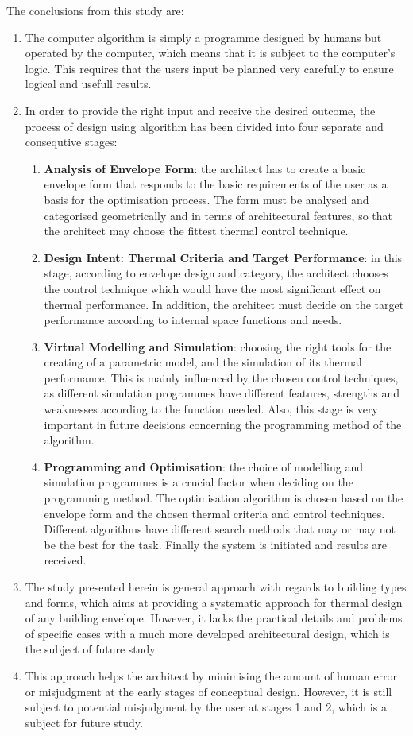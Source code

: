 The conclusions from this study are:
\begin{enumerate}
	\item The computer algorithm is simply a programme designed by humans but operated by the computer, which means that it is subject to the computer's logic. This requires that the users input be planned very carefully to ensure logical and usefull results.
	\item In order to provide the right input and receive the desired outcome, the process of design using algorithm has been divided into four separate and consequtive stages:
		\begin{enumerate}
			\item \textbf{Analysis of Envelope Form}: the architect has to create a basic envelope form that responds to the basic requirements of the user as a basis for the optimisation process. The form must be analysed and categorised geometrically and in terms of architectural features, so that the architect may choose the fittest thermal control technique.
			\item \textbf{Design Intent: Thermal Criteria and Target Performance}: in this stage, according to envelope design and category, the architect chooses the control technique which would have the most significant effect on thermal performance. In addition, the architect must decide on the target performance according to internal space functions and needs.
			\item \textbf{Virtual Modelling and Simulation}: choosing the right tools for the creating of a parametric model, and the simulation of its thermal performance. This is mainly influenced by the chosen control techniques, as different simulation programmes have different features, strengths and weaknesses according to the function needed. Also, this stage is very important in future decisions concerning the programming method of the algorithm.
			\item \textbf{Programming and Optimisation}: the choice of modelling and simulation programmes is a crucial factor when deciding on the programming method. The optimisation algorithm is chosen based on the envelope form and the chosen thermal criteria and control techniques. Different algorithms have different search methods that may or may not be the best for the task. Finally the system is initiated and results are received.
		\end{enumerate}
	\item The study presented herein is general approach with regards to building types and forms, which aims at providing a systematic approach for thermal design of any building envelope. However, it lacks the practical details and problems of specific cases with a much more developed architectural design, which is the subject of future study.
	\item This approach helps the architect by minimising the amount of human error or misjudgment at the early stages of conceptual design. However, it is still subject to potential misjudgment by the user at stages 1 and 2, which is a subject for future study.
\end{enumerate}

